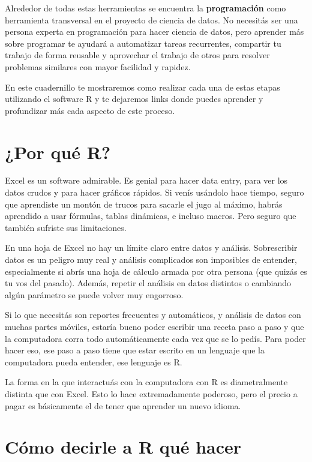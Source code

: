 \documentclass[
  openany]{book}
\begin{document}
Alrededor de todas estas herramientas se encuentra la \textbf{programación} como herramienta transversal en el proyecto de ciencia de datos.
No necesitás ser una persona experta en programación para hacer ciencia de datos, pero aprender más sobre programar te ayudará a automatizar tareas recurrentes, compartir tu trabajo de forma reusable y aprovechar el trabajo de otros para resolver problemas similares con mayor facilidad y rapidez.

En este cuadernillo te mostraremos como realizar cada una de estas etapas utilizando el software R y te dejaremos links donde puedes aprender y profundizar más cada aspecto de este proceso.

\hypertarget{por-quuxe9-r}{%
\section{¿Por qué R?}\label{por-quuxe9-r}}

Excel es un software admirable.
Es genial para hacer data entry, para ver los datos crudos y para hacer gráficos rápidos.
Si venís usándolo hace tiempo, seguro que aprendiste un montón de trucos para sacarle el jugo al máximo, habrás aprendido a usar fórmulas, tablas dinámicas, e incluso macros.
Pero seguro que también sufriste sus limitaciones.

En una hoja de Excel no hay un límite claro entre datos y análisis.
Sobrescribir datos es un peligro muy real y análisis complicados son imposibles de entender, especialmente si abrís una hoja de cálculo armada por otra persona (que quizás es tu vos del pasado).
Además, repetir el análisis en datos distintos o cambiando algún parámetro se puede volver muy engorroso.

Si lo que necesitás son reportes frecuentes y automáticos, y análisis de datos con muchas partes móviles, estaría bueno poder escribir una receta paso a paso y que la computadora corra todo automáticamente cada vez que se lo pedís.
Para poder hacer eso, ese paso a paso tiene que estar escrito en un lenguaje que la computadora pueda entender, ese lenguaje es R.

La forma en la que interactuás con la computadora con R es diametralmente distinta que con Excel.
Esto lo hace extremadamente poderoso, pero el precio a pagar es básicamente el de tener que aprender un nuevo idioma.

\hypertarget{cuxf3mo-decirle-a-r-quuxe9-hacer}{%
\section{Cómo decirle a R qué hacer}\label{cuxf3mo-decirle-a-r-quuxe9-hacer}}
\end{document}

